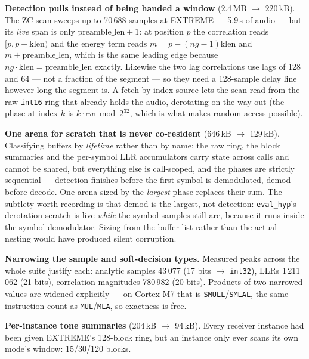 \textbf{Detection pulls instead of being handed a window} (2.4\,MB
$\rightarrow$ 220\,kB). The ZC scan sweeps up to 70\,688 samples at
EXTREME --- 5.9\,s of audio --- but its \emph{live} span is only
$\mathrm{preamble\_len}+1$: at position $p$ the correlation reads
$[p, p{+}\mathrm{klen})$ and the energy term reads
$m = p-(ng{-}1)\mathrm{klen}$ and $m+\mathrm{preamble\_len}$, which is
the same leading edge because $ng \cdot \mathrm{klen} =
\mathrm{preamble\_len}$ exactly. Likewise the two lag correlations use
lags of 128 and 64 --- not a fraction of the segment --- so they need a
128-sample delay line however long the segment is. A fetch-by-index
source lets the scan read from the raw \texttt{int16} ring that already
holds the audio, derotating on the way out (the phase at index $k$ is
$k \cdot cw \bmod 2^{32}$, which is what makes random access possible).

\textbf{One arena for scratch that is never co-resident} (646\,kB
$\rightarrow$ 129\,kB). Classifying buffers by \emph{lifetime} rather
than by name: the raw ring, the block summaries and the per-symbol LLR
accumulators carry state across calls and cannot be shared, but
everything else is call-scoped, and the phases are strictly sequential
--- detection finishes before the first symbol is demodulated, demod
before decode. One arena sized by the \emph{largest} phase replaces
their sum. The subtlety worth recording is that demod is the largest,
not detection: \texttt{eval\_hyp}'s derotation scratch is live
\emph{while} the symbol samples still are, because it runs inside the
symbol demodulator. Sizing from the buffer list rather than the actual
nesting would have produced silent corruption.

\textbf{Narrowing the sample and soft-decision types.} Measured peaks
across the whole suite justify each: analytic samples 43\,077 (17 bits
$\rightarrow$ \texttt{int32}), LLRs 1\,211\,062 (21 bits), correlation
magnitudes 780\,982 (20 bits). Products of two narrowed values are
widened explicitly --- on Cortex-M7 that is \texttt{SMULL}/\texttt{SMLAL},
the same instruction count as \texttt{MUL}/\texttt{MLA}, so exactness is
free.

\textbf{Per-instance tone summaries} (204\,kB $\rightarrow$ 94\,kB).
Every receiver instance had been given EXTREME's 128-block ring, but an
instance only ever scans its own mode's window: 15/30/120 blocks.

